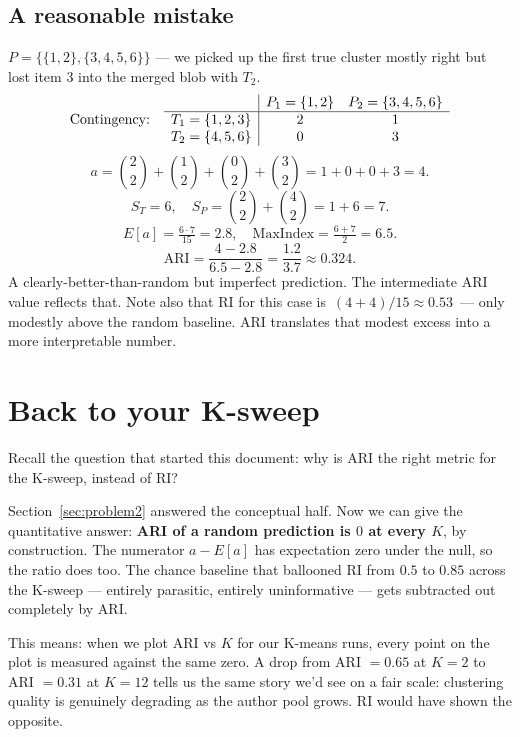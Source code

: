 \documentclass[11pt]{article}
\begin{document}
\subsection{A reasonable mistake}
$P = \{\{1, 2\}, \{3, 4, 5, 6\}\}$ --- we picked up the first true cluster
mostly right but lost item 3 into the merged blob with $T_2$.
\[
\text{Contingency:} \quad
\begin{array}{c | c c}
 & P_1 = \{1,2\} & P_2 = \{3,4,5,6\} \\
\hline
T_1 = \{1,2,3\} & 2 & 1 \\
T_2 = \{4,5,6\} & 0 & 3 \\
\end{array}
\]
\[
  a = \binom{2}{2} + \binom{1}{2} + \binom{0}{2} + \binom{3}{2} = 1 + 0 + 0 + 3 = 4.
\]
\[
  S_T = 6, \quad S_P = \binom{2}{2} + \binom{4}{2} = 1 + 6 = 7.
\]
\[
  E[a] = \tfrac{6 \cdot 7}{15} = 2.8, \quad \mathrm{MaxIndex} = \tfrac{6+7}{2} = 6.5.
\]
\[
  \text{ARI} = \frac{4 - 2.8}{6.5 - 2.8} = \frac{1.2}{3.7} \approx 0.324.
\]
A clearly-better-than-random but imperfect prediction. The intermediate
ARI value reflects that. Note also that RI for this case is
$\,(4 + 4)/15 \approx 0.53\,$ --- only modestly above the random baseline.
ARI translates that modest excess into a more interpretable number.

\section{Back to your K-sweep}

Recall the question that started this document: why is ARI the right
metric for the K-sweep, instead of RI?

Section~\ref{sec:problem2} answered the conceptual half. Now we can give
the quantitative answer: \textbf{ARI of a random prediction is $0$ at
every $K$}, by construction. The numerator $a - E[a]$ has expectation
zero under the null, so the ratio does too. The chance baseline that
ballooned RI from $0.5$ to $0.85$ across the K-sweep --- entirely
parasitic, entirely uninformative --- gets subtracted out completely by
ARI.

This means: when we plot ARI vs $K$ for our K-means runs, every point on
the plot is measured against the same zero. A drop from ARI $= 0.65$ at
$K=2$ to ARI $= 0.31$ at $K=12$ tells us the same story we'd see on a
fair scale: clustering quality is genuinely degrading as the author pool
grows. RI would have shown the opposite.
\end{document}
